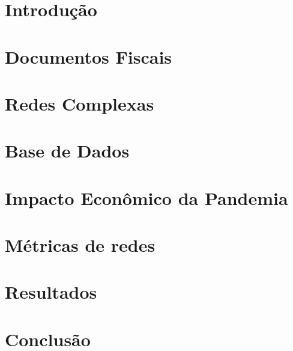 \documentclass[mestrado, pre-defesa]{packages/icmc}
\begin{document}
\textual

\chapter{Introdução}
\label{chapter:introducao}


\chapter{Documentos Fiscais}
\label{chapter:documenos-fiscais}


\chapter{Redes Complexas}
\label{chapter:redes}


\chapter{Base de Dados}
\label{chapter:base-de-dados}


\chapter{Impacto Econômico da Pandemia}
\label{chapter:impacto-economico}


\chapter{Métricas de redes}
\label{chapter:metricas-redes}


\chapter{Resultados}
\label{chapter:resultados}


\chapter{Conclusão}
\label{chapter:conclusão}


% 
\end{document}
